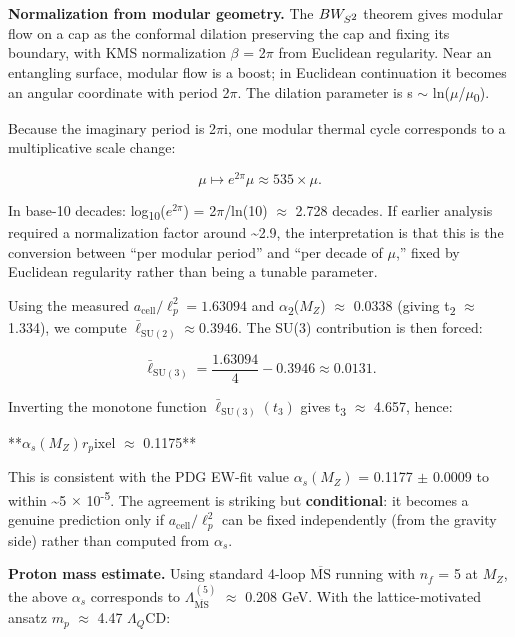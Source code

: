 \documentclass[11pt,a4paper]{article}
\theoremstyle{remark}
\begin{document}
\textbf{Normalization from modular geometry.} The \(BW_{S\textsuperscript{2}}\) theorem gives modular flow on a cap as the conformal dilation preserving the cap and fixing its boundary, with KMS normalization \ensuremath{\beta} = 2\ensuremath{\pi} from Euclidean regularity. Near an entangling surface, modular flow is a boost; in Euclidean continuation it becomes an angular coordinate with period 2\ensuremath{\pi}. The dilation parameter is s \ensuremath{\sim} ln(\ensuremath{\mu}/\ensuremath{\mu}\textsubscript{0}).

Because the imaginary period is 2\ensuremath{\pi}i, one modular thermal cycle corresponds to a multiplicative scale change:

\[
\mu \mapsto e^{2\pi} \mu \approx 535 \times \mu.
\]

In base-10 decades: log\textsubscript{10}(\(e^{2\ensuremath{\pi}}\)) = 2\ensuremath{\pi}/ln(10) \ensuremath{\approx} 2.728 decades. If earlier analysis required a normalization factor around \textasciitilde2.9, the interpretation is that this is the conversion between ``per modular period'' and ``per decade of \ensuremath{\mu},'' fixed by Euclidean regularity rather than being a tunable parameter.

Using the measured \(a_{\mathrm{cell}}/\ell_p^2 = 1.63094\) and \ensuremath{\alpha}\textsubscript{2}(\(M_Z\)) \ensuremath{\approx} 0.0338
(giving t\textsubscript{2} \ensuremath{\approx} 1.334), we compute \(\bar{\ell}_{\mathrm{SU}(2)} \ensuremath{\approx} 0.3946\). The
SU(3) contribution is then forced:

\[
\bar{\ell}_{\mathrm{SU}(3)} = \frac{1.63094}{4} - 0.3946 \approx 0.0131.
\]

Inverting the monotone function \(\bar{\ell}_{\mathrm{SU}(3)}(t_3)\) gives
t\textsubscript{3} \ensuremath{\approx} 4.657, hence:

**\(\ensuremath{\alpha}_s(M_Z)\)\textba$r_p$ixel \ensuremath{\approx} 0.1175**

This is consistent with the PDG EW-fit value \(\ensuremath{\alpha}_s(M_Z)\) = 0.1177 \ensuremath{\pm} 0.0009 to within
\textasciitilde5 \ensuremath{\times} 10\textsuperscript{-5}. The agreement is striking but \textbf{conditional}: it becomes a
genuine prediction only if \(a_{\mathrm{cell}}/\ell_p^2\) can be fixed
independently (from the gravity side) rather than computed from \(\ensuremath{\alpha}_s\).

\textbf{Proton mass estimate.} Using standard 4-loop \(\overline{\mathrm{MS}}\) running
with \(n_f\) = 5 at \(M_Z\), the above \(\ensuremath{\alpha}_s\) corresponds to
\(\ensuremath{\Lambda}_{\overline{\mathrm{MS}}}^{(5)}\) \ensuremath{\approx} 0.208 GeV. With the lattice-motivated ansatz
\(m_p\) \ensuremath{\approx} 4.47 \(\ensuremath{\Lambda}_Q\)CD:
\end{document}
